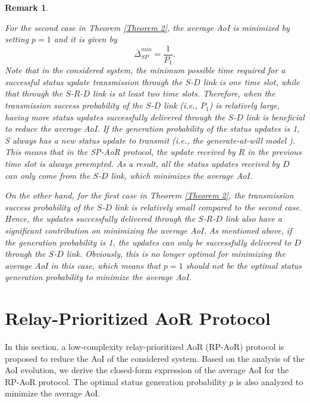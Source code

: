 \documentclass{IEEEtran}
\newtheorem{remark}{Remark}
\begin{document}
\begin{remark} \label{remark1}
	{For the second case in Theorem \ref{Theorem 2}, the average AoI is minimized by setting $p=1$ and it is given by
		\begin{equation}\label{SP_AoI}
		\bar\Delta_{SP}^{min}=\frac{1}{P_{1}}.
		\end{equation}
		Note that in the considered system, the minimum possible time required for a successful status update transmission through the $S$-$D$ link is one time slot, while that through the $S$-$R$-$D$ link is at least two time slots. Therefore, when the transmission success probability of the $S$-$D$ link (i.e., $P_{1}$) is relatively large, having more status updates successfully delivered through the $S$-$D$ link is beneficial to reduce the average AoI. If the generation probability of the status updates is 1, S always has a new status update to transmit (i.e., the generate-at-will model \cite{b9}). This means that in the SP-AoR protocol, the update received by $R$ in the previous time slot is always preempted. As a result, all the status updates received by $D$ can only come from the $S$-$D$ link, which minimizes the average AoI.
		
		On the other hand, for the first case in Theorem \ref{Theorem 2}, the transmission success probability of the $S$-$D$ link is relatively small compared to the second case. Hence, the updates successfully delivered through the $S$-$R$-$D$ link also have a significant contribution on minimizing the average AoI. As mentioned above, if the generation probability is 1, the updates can only be successfully delivered to $D$ through the $S$-$D$ link. Obviously, this is no longer optimal for minimizing the average AoI in this case, which means that $p=1$ should not be the optimal status generation probability to minimize the average AoI.}
\end{remark}

\vspace{-0.3cm}
\section{Relay-Prioritized AoR Protocol}
In this section, a low-complexity relay-prioritized AoR (RP-AoR) protocol is proposed to reduce the AoI of the considered system. Based on the analysis of the AoI evolution, we derive the closed-form expression of the average AoI for the RP-AoR protocol. The optimal status generation probability $p$ is also analyzed to minimize the average AoI.
\end{document}
